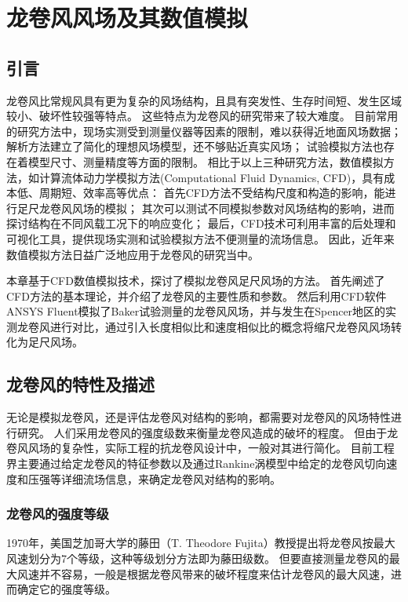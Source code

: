 \graphicspath{{figures/tornado/}}
\chapter{龙卷风风场及其数值模拟}\label{chapter:tornado}

\section{引言}
龙卷风比常规风具有更为复杂的风场结构，且具有突发性、生存时间短、发生区域较小、破坏性较强等特点。
这些特点为龙卷风的研究带来了较大难度。
目前常用的研究方法中，现场实测受到测量仪器等因素的限制，难以获得近地面风场数据；
解析方法建立了简化的理想风场模型，还不够贴近真实风场；
试验模拟方法也存在着模型尺寸、测量精度等方面的限制。
相比于以上三种研究方法，数值模拟方法，如计算流体动力学模拟方法(Computational Fluid Dynamics, CFD)，具有成本低、周期短、效率高等优点：
首先CFD方法不受结构尺度和构造的影响，能进行足尺龙卷风风场的模拟；
其次可以测试不同模拟参数对风场结构的影响，进而探讨结构在不同风载工况下的响应变化；
最后，CFD技术可利用丰富的后处理和可视化工具，提供现场实测和试验模拟方法不便测量的流场信息。
因此，近年来数值模拟方法日益广泛地应用于龙卷风的研究当中。

本章基于CFD数值模拟技术，探讨了模拟龙卷风足尺风场的方法。
首先阐述了CFD方法的基本理论，并介绍了龙卷风的主要性质和参数。
然后利用CFD软件ANSYS Fluent模拟了Baker试验测量的龙卷风风场，并与发生在Spencer地区的实测龙卷风进行对比，通过引入长度相似比和速度相似比的概念将缩尺龙卷风风场转化为足尺风场。




\section{龙卷风的特性及描述}
无论是模拟龙卷风，还是评估龙卷风对结构的影响，都需要对龙卷风的风场特性进行研究。
人们采用龙卷风的强度级数来衡量龙卷风造成的破坏的程度。
但由于龙卷风风场的复杂性，实际工程的抗龙卷风设计中，一般对其进行简化。
目前工程界主要通过给定龙卷风的特征参数以及通过Rankine涡模型中给定的龙卷风切向速度和压强等详细流场信息，来确定龙卷风对结构的影响。

\subsection{龙卷风的强度等级}
1970年，美国芝加哥大学的藤田（T. Theodore Fujita）教授提出将龙卷风按最大风速划分为7个等级，这种等级划分方法即为藤田级数。
但要直接测量龙卷风的最大风速并不容易，一般是根据龙卷风带来的破坏程度来估计龙卷风的最大风速，进而确定它的强度等级。

